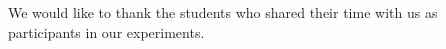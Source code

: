 \documentclass[10pt]{sigplanconf}
\begin{document}



%

\acks
We would like to thank the students who shared their time with us as participants in our experiments.




\end{document}
